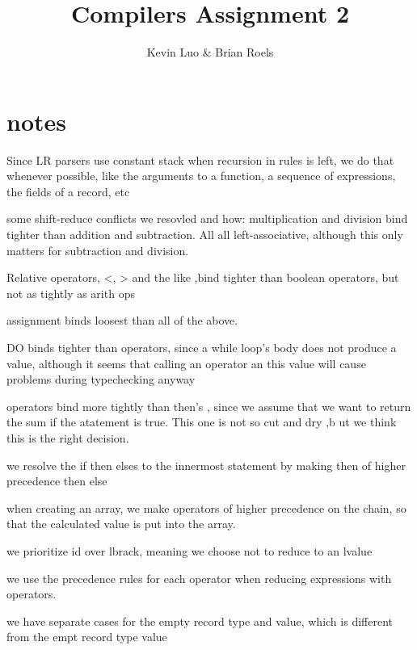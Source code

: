 \documentclass{notes}
\title{Compilers Assignment 2}
\author{Kevin Luo \& Brian Roels}
\begin{document}
  \maketitle
  \newpage
  \tableofcontents
  \newpage

\section{notes}
Since LR parsers use constant stack when recursion in rules is left,
we do that whenever possible, like the arguments to a function, a
sequence of expressions, the fields of a record, etc

some shift-reduce conflicts we resovled and how:
multiplication and division bind tighter than addition and
subtraction. All all left-associative, although this only matters for
subtraction and division.

Relative operators, <, > and the like ,bind tighter than boolean
operators, but not as tightly as arith ops

assignment binds loosest than all of the above.

DO binds tighter than operators, since a while loop's body does not
produce a value, although it seems that calling an operator an this
value will cause problems during typechecking anyway

operators bind more tightly than then's , since we assume that we want
to return the sum if the atatement is true.  This one is not so cut
and dry ,b ut we think this is the right decision.

we resolve the if then elses to the innermost statement by making then
of higher precedence then else

when creating an array, we make operators of higher precedence on the
chain, so that the calculated value is put into the array.

we prioritize id over lbrack, meaning we choose not to reduce to an
lvalue

we use the precedence rules for each operator when reducing
expressions with operators.

we have separate cases for the empty record type and value, which is
different from the empt record type value
\end{document}
